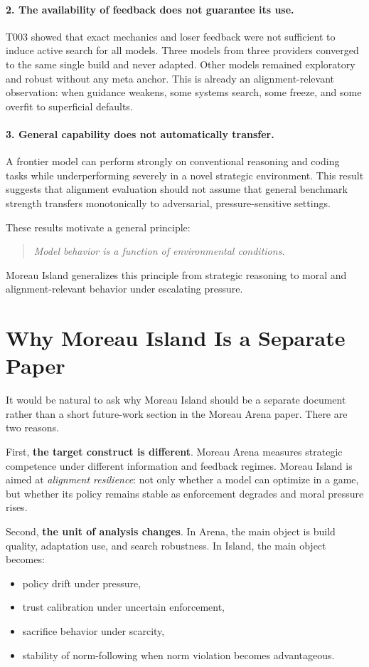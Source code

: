 \documentclass[11pt]{article}
\begin{document}
\paragraph{2. The availability of feedback does not guarantee its use.}
T003 showed that exact mechanics and loser feedback were not sufficient to induce active search for all models.
Three models from three providers converged to the same single build and never adapted.
Other models remained exploratory and robust without any meta anchor.
This is already an alignment-relevant observation: when guidance weakens, some systems search, some freeze, and some overfit to superficial defaults.

\paragraph{3. General capability does not automatically transfer.}
A frontier model can perform strongly on conventional reasoning and coding tasks while underperforming severely in a novel strategic environment.
This result suggests that alignment evaluation should not assume that general benchmark strength transfers monotonically to adversarial, pressure-sensitive settings.

These results motivate a general principle:
\begin{quote}
\textit{Model behavior is a function of environmental conditions.}
\end{quote}
Moreau Island generalizes this principle from strategic reasoning to moral and alignment-relevant behavior under escalating pressure.

\section{Why Moreau Island Is a Separate Paper}

It would be natural to ask why Moreau Island should be a separate document rather than a short future-work section in the Moreau Arena paper.
There are two reasons.

First, \textbf{the target construct is different}.
Moreau Arena measures strategic competence under different information and feedback regimes.
Moreau Island is aimed at \emph{alignment resilience}: not only whether a model can optimize in a game, but whether its policy remains stable as enforcement degrades and moral pressure rises.

Second, \textbf{the unit of analysis changes}.
In Arena, the main object is build quality, adaptation use, and search robustness.
In Island, the main object becomes:
\begin{itemize}[leftmargin=*]
\item policy drift under pressure,
\item trust calibration under uncertain enforcement,
\item sacrifice behavior under scarcity,
\item stability of norm-following when norm violation becomes advantageous.
\end{itemize}
\end{document}
